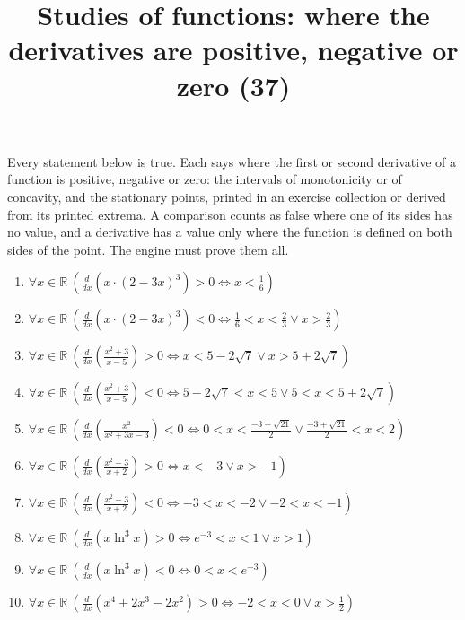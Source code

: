 \documentclass[11pt,a4paper]{article}
\title{Studies of functions: where the derivatives are positive, negative or zero (37)}
\author{}
\date{}
\begin{document}
\maketitle
Every statement below is true. Each says where the first or second derivative of a function is positive, negative or zero: the intervals of monotonicity or of concavity, and the stationary points, printed in an exercise collection or derived from its printed extrema. A comparison counts as false where one of its sides has no value, and a derivative has a value only where the function is defined on both sides of the point. The engine must prove them all.

\begin{enumerate}
\item $\displaystyle \forall x \in \mathbb{R}\ \left(\frac{d}{dx}\left( x \cdot (2 - 3x)^{3} \right) > 0 \iff x < \frac{1}{6}\right)$
\item $\displaystyle \forall x \in \mathbb{R}\ \left(\frac{d}{dx}\left( x \cdot (2 - 3x)^{3} \right) < 0 \iff \frac{1}{6} < x < \frac{2}{3} \lor x > \frac{2}{3}\right)$
\item $\displaystyle \forall x \in \mathbb{R}\ \left(\frac{d}{dx}\left( \frac{x^{2} + 3}{x - 5} \right) > 0 \iff x < 5 - 2\sqrt{7} \lor x > 5 + 2\sqrt{7}\right)$
\item $\displaystyle \forall x \in \mathbb{R}\ \left(\frac{d}{dx}\left( \frac{x^{2} + 3}{x - 5} \right) < 0 \iff 5 - 2\sqrt{7} < x < 5 \lor 5 < x < 5 + 2\sqrt{7}\right)$
\item $\displaystyle \forall x \in \mathbb{R}\ \left(\frac{d}{dx}\left( \frac{x^{2}}{x^{2} + 3x - 3} \right) < 0 \iff 0 < x < \frac{-3 + \sqrt{21}}{2} \lor \frac{-3 + \sqrt{21}}{2} < x < 2\right)$
\item $\displaystyle \forall x \in \mathbb{R}\ \left(\frac{d}{dx}\left( \frac{x^{2} - 3}{x + 2} \right) > 0 \iff x < -3 \lor x > -1\right)$
\item $\displaystyle \forall x \in \mathbb{R}\ \left(\frac{d}{dx}\left( \frac{x^{2} - 3}{x + 2} \right) < 0 \iff -3 < x < -2 \lor -2 < x < -1\right)$
\item $\displaystyle \forall x \in \mathbb{R}\ \left(\frac{d}{dx}\left( x\ln^{3} x \right) > 0 \iff e^{-3} < x < 1 \lor x > 1\right)$
\item $\displaystyle \forall x \in \mathbb{R}\ \left(\frac{d}{dx}\left( x\ln^{3} x \right) < 0 \iff 0 < x < e^{-3}\right)$
\item $\displaystyle \forall x \in \mathbb{R}\ \left(\frac{d}{dx}\left( x^{4} + 2x^{3} - 2x^{2} \right) > 0 \iff -2 < x < 0 \lor x > \frac{1}{2}\right)$

\end{enumerate}
\end{document}
